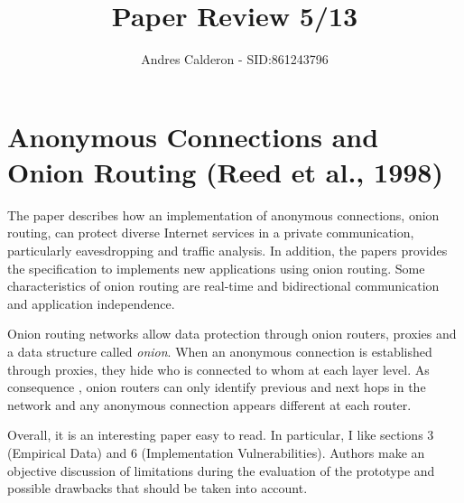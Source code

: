 \documentclass[a4paper,10pt]{scrartcl}
\title{Paper Review 5/13}
\author{Andres Calderon - SID:861243796}
\begin{document}
\maketitle
\thispagestyle{empty}

\section*{Anonymous Connections and Onion Routing (Reed et al., 1998)}
The paper describes how an implementation of anonymous connections, onion routing, can protect diverse Internet services in a private communication, particularly eavesdropping and traffic analysis. In addition, the papers provides the specification to implements new applications using onion routing.  Some characteristics of onion routing are real-time and bidirectional communication and application independence.

Onion routing networks allow data protection through onion routers, proxies and a data structure called \textit{onion}. When an anonymous connection is established through proxies, they hide who is connected to whom at each layer level.  As consequence , onion routers can only identify previous and next hops in the network and any anonymous connection appears different at each router.

Overall, it is an interesting paper easy to read. In particular, I like sections 3 (Empirical Data) and 6 (Implementation Vulnerabilities).  Authors make an objective discussion of limitations during the evaluation of the prototype and possible drawbacks that should be taken into account.

\end{document}

